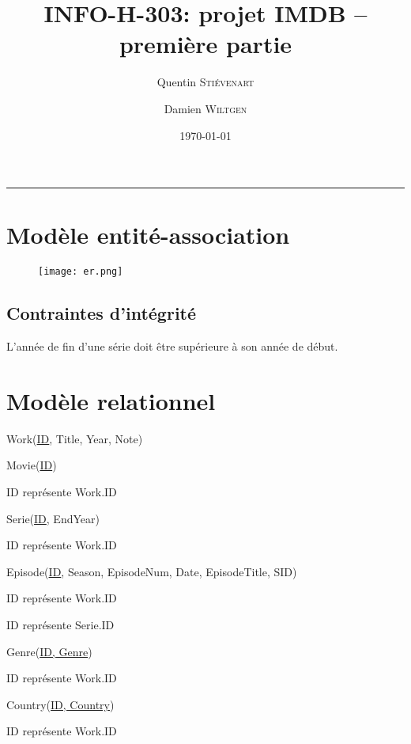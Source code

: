 \documentclass[a4paper,12pt]{article}
\title{INFO-H-303: projet IMDB -- première partie}
\author{Quentin \textsc{Stiévenart} \and Damien \textsc{Wiltgen}}
\date{\today}
\newcommand{\HRule}{\rule{\linewidth}{0.5mm}}
\begin{document}
\maketitle

\HRule

\section{Modèle entité-association}

\begin{figure}[ht!]
  \centering
  \centerline{\texttt{[image: er.png]}}
\end{figure}

\subsection{Contraintes d'intégrité}
\begin{list}{-}{}
  \item L'année de fin d'une série doit être supérieure à son année de début.
\end{list}
\section{Modèle relationnel}
Work(\underline{ID}, Title, Year, Note)

Movie(\underline{ID})
\begin{list}{-}{}
  \item ID représente Work.ID
\end{list}

Serie(\underline{ID}, EndYear)
\begin{list}{-}{}
  \item ID représente Work.ID
\end{list}

Episode(\underline{ID}, Season, EpisodeNum, Date, EpisodeTitle, SID)
\begin{list}{-}{}
  \item ID représente Work.ID
  \item ID représente Serie.ID
\end{list}

Genre(\underline{ID, Genre})
\begin{list}{-}{}
  \item ID représente Work.ID
\end{list}

Country(\underline{ID, Country})
\begin{list}{-}{}
  \item ID représente Work.ID
\end{list}
\end{document}
